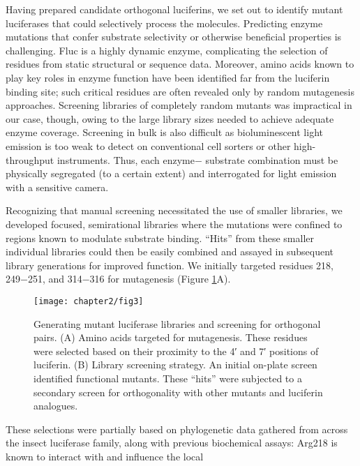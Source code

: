 Having prepared
candidate orthogonal luciferins, we set out to identify
mutant luciferases that could selectively process the molecules.
Predicting enzyme mutations that confer substrate selectivity or
otherwise beneficial properties is challenging. Fluc is a highly
dynamic enzyme,\cite{Sundlov:2012kn, Mao:2011bi} complicating the selection of residues
from static structural or sequence data. Moreover, amino acids
known to play key roles in enzyme function have been
identified far from the luciferin binding site;\cite{AdamsJr:2016bn} such critical
residues are often revealed only by random mutagenesis
approaches.\cite{Chen:2012bb, Reetz:2010dv} Screening libraries of completely random
mutants was impractical in our case, though, owing to the
large library sizes needed to achieve adequate enzyme
coverage.\cite{Reetz:2010dv} Screening in bulk is also difficult as bioluminescent
light emission is too weak to detect on conventional cell sorters
or other high-throughput instruments. Thus, each enzyme−
substrate combination must be physically segregated (to a
certain extent) and interrogated for light emission with a
sensitive camera.
\par
Recognizing that manual screening necessitated the use of
smaller libraries, we developed focused, semirational libraries
where the mutations were confined to regions known to
modulate substrate binding.\cite{Kille:2012dt} “Hits” from these smaller
individual libraries could then be easily combined and assayed
in subsequent library generations for improved function. We
initially targeted residues 218, 249−251, and 314−316 for
mutagenesis (Figure \ref{fig:residues_screening}A).
\begin{figure}[htbp]
\texttt{[image: chapter2/fig3]}
\centering
\caption[Generating mutant luciferase libraries and screening for orthogonal pairs]{Generating mutant luciferase libraries and screening for orthogonal pairs. (A) Amino acids targeted for mutagenesis. These residues were
selected based on their proximity to the 4′ and 7′ positions of luciferin. (B) Library screening strategy. An initial on-plate screen identified functional
mutants. These “hits” were subjected to a secondary screen for orthogonality with other mutants and luciferin analogues.}
  \label{fig:residues_screening}
\end{figure}
These selections were partially based on phylogenetic data gathered from across the insect luciferase
family,\cite{RN45, Amaral:2014cz} along with previous biochemical assays: Arg218 is
known to interact with \dluciferin{} and influence the local
